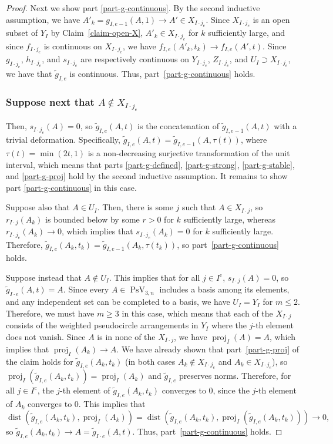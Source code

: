 \documentclass[11pt]{article}
\numberwithin{equation}{section}
\theoremstyle{remark}
\newcommand{\compl}[1]{{{#1}^{\text{c}}}}
\DeclareMathOperator{\dist}{dist}
\DeclareMathOperator{\pstief}{PsV}
\DeclareMathOperator{\proj}{proj}
\begin{document}
\begin{proof}
Next we show part \eqref{part-g-continuous}.
By the second inductive assumption, we have $A'_k = g_{I,e-1}(A,1) \to A' \in X_{I\cdot j_e}$.
Since $X_{I\cdot j_e}$ is an open subset of $Y_I$ by Claim~\ref{claim-open-X}, $A'_k \in X_{I\cdot j_e}$ for $k$ sufficiently large, and since $f_{I\cdot j_e}$ is continuous on $X_{I\cdot j_e}$, we have $f_{I,e}(A'_k,t_k) \to f_{I,e}(A',t)$.
Since $g_{I\cdot j_e}$, $h_{I\cdot j_e}$, and $s_{I\cdot j_e}$ are respectively continuous on $Y_{I\cdot j_e}$, $Z_{I\cdot j_e}$, and $U_{I} \supset X_{I\cdot j_e}$, we have that $\tilde g_{I,e}$ is continuous. Thus, part~\eqref{part-g-continuous} holds.

\subsubsection*{Suppose next that $A \not\in X_{I\cdot j_e}$}

Then, $s_{I\cdot j_e}(A) = 0$, so $\tilde g_{I,e}(A,t)$ is the concatenation of $\tilde g_{I,e-1}(A,t)$ with a trivial deformation.
Specifically, $\tilde g_{I,e}(A,t) = \tilde g_{I,e-1}(A,\tau(t))$, where $\tau(t) = \min(2t,1)$
is a non-decreasing surjective transformation of the unit interval, which means that parts \eqref{part-g-defined}, \eqref{part-g-strong}, \eqref{part-g-stable}, and \eqref{part-g-proj} hold by the second inductive assumption. It remains to show part \eqref{part-g-continuous} in this case.

Suppose also that $A \in U_I$. Then, there is some $j$ such that $A \in X_{I\cdot j}$, so $r_{I\cdot j}(A_k)$ is bounded below by some $r > 0$ for $k$ sufficiently large, whereas $r_{I\cdot j_e}(A_k) \to 0$, which implies that $s_{I\cdot j_e}(A_k) = 0$ for $k$ sufficiently large. Therefore, $\tilde g_{I,e}(A_k,t_k) = \tilde g_{I,e-1}(A_k,\tau(t_k))$, so part~\eqref{part-g-continuous} holds.

Suppose instead that $A \not\in U_I$.
This implies that for all $j \in \compl{I}$, $s_{I\cdot j}(A) = 0$, so $\tilde g_{I\cdot e}(A,t) = A$.
Since every $A \in \pstief_{3,n}$ includes a basis among its elements, and any independent set can be completed to a basis, we have $U_I = Y_I$ for $m \leq 2$. Therefore, we must have $m \geq 3$ in this case, which means that each of the $X_{I\cdot j}$ consists of the weighted pseudocircle arrangements in $Y_I$ where the $j$-th element does not vanish. Since $A$ is in none of the $X_{I\cdot j}$, we have $\proj_I(A) = A$, which implies that $\proj_I(A_k) \to A$.
We have already shown that part~\eqref{part-g-proj} of the claim holds for $\tilde g_{I,e}(A_k,t_k)$ (in both cases $A_k \not\in X_{I\cdot j_e}$ and $A_k \in X_{I\cdot j_e}$), so $\proj_I(\tilde g_{I,e}(A_k,t_k)) = \proj_I(A_k)$ and $\tilde g_{I,e}$ preserves norms. Therefore, for all $j \in \compl{I}$, the $j$-th element of $\tilde g_{I,e}(A_k,t_k)$ converges to 0, since the $j$-th element of $A_k$ converges to 0. This implies that \[ \dist(\tilde g_{I,e}(A_k,t_k),\proj_I(A_k)) = \dist(\tilde g_{I,e}(A_k,t_k),\proj_I(\tilde g_{I,e}(A_k,t_k))) \to 0, \]
so $\tilde g_{I,e}(A_k,t_k) \to A = \tilde g_{I\cdot e}(A,t)$.
Thus, part~\eqref{part-g-continuous} holds.


\end{proof}
\end{document}
